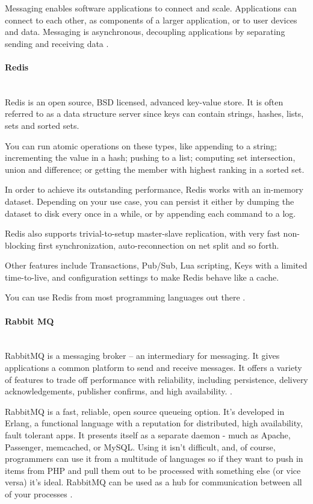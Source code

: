 \documentclass[thesis=B,english]{FITthesis}[2013/04/26]
\newcommand{\myparagraph}[1]{\paragraph{#1}\mbox{}\\}
\begin{document}
Messaging enables software applications to connect and scale. Applications can connect to each other, as components of a larger application, or to user devices and data. Messaging is asynchronous, decoupling applications by separating sending and receiving data \cite{rabbitmq_official}.

\myparagraph{Redis}

Redis is an open source, BSD licensed, advanced key-value store. It is often referred to as a data structure server since keys can contain strings, hashes, lists, sets and sorted sets.

You can run atomic operations on these types, like appending to a string; incrementing the value in a hash; pushing to a list; computing set intersection, union and difference; or getting the member with highest ranking in a sorted set.

In order to achieve its outstanding performance, Redis works with an in-memory dataset. Depending on your use case, you can persist it either by dumping the dataset to disk every once in a while, or by appending each command to a log.

Redis also supports trivial-to-setup master-slave replication, with very fast non-blocking first synchronization, auto-reconnection on net split and so forth.

Other features include Transactions, Pub/Sub, Lua scripting, Keys with a limited time-to-live, and configuration settings to make Redis behave like a cache.

You can use Redis from most programming languages out there \cite{redis}.

\myparagraph{Rabbit MQ}

RabbitMQ is a messaging broker -- an intermediary for messaging. It gives  applications a common platform to send and receive messages. It offers a variety of features to trade off performance with reliability, including persistence, delivery acknowledgements, publisher confirms, and high availability. \cite{rabbitmq_official}.

RabbitMQ is a fast, reliable, open source queueing option. It's developed in Erlang, a functional language with a reputation for distributed, high availability, fault tolerant apps. It presents itself as a separate daemon - much as Apache, Passenger, memcached, or MySQL. Using it isn’t difficult, and, of course, programmers can use it from a multitude of languages so if they want to push in items from PHP and pull them out to be processed with something else (or vice versa) it's ideal. RabbitMQ can be used as a hub for communication between all of your processes \cite{rabbitmq}.
\end{document}

